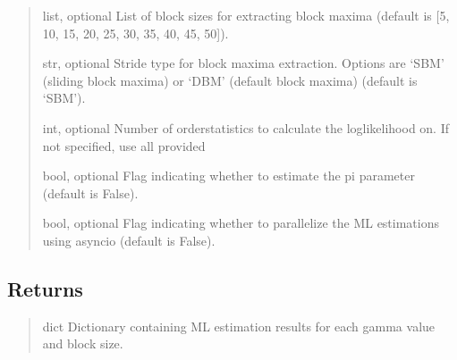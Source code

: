 \documentclass[a4paper,11pt,openany,english]{sphinxmanual}
\begin{document}
\begin{fulllineitems}
\begin{quote}
\begin{description}
\sphinxAtStartPar
list, optional
List of block sizes for extracting block maxima (default is {[}5, 10, 15, 20, 25, 30, 35, 40, 45, 50{]}).

\sphinxAtStartPar
str, optional
Stride type for block maxima extraction. Options are ‘SBM’ (sliding block maxima) or ‘DBM’ (default block maxima) (default is ‘SBM’).

\sphinxAtStartPar
int, optional
Number of orderstatistics to calculate the log\sphinxhyphen{}likelihood on. If not specified, use all provided

\sphinxAtStartPar
bool, optional
Flag indicating whether to estimate the pi parameter (default is False).

\sphinxAtStartPar
bool, optional
Flag indicating whether to parallelize the ML estimations using asyncio (default is False).

\end{description}\end{quote}


\subsection{Returns}
\label{\detokenize{api_topt:id96}}\begin{quote}\begin{description}
\sphinxAtStartPar
dict
Dictionary containing ML estimation results for each gamma value and block size.

\end{description}\end{quote}

\end{fulllineitems}
\end{document}
